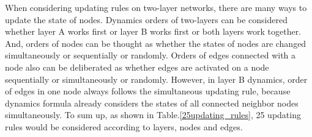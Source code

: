 When considering updating rules on two-layer networks, there are many ways to update the state of nodes. Dynamics orders of two-layers can be considered whether layer A works first or layer B works first or both layers work together. And, orders of nodes can be thought as whether the states of nodes are changed simultaneously or sequentially or randomly. Orders of edges connected with a node also can be deliberated as whether edges are activated on a node sequentially or simultaneously or randomly. However, in layer B dynamics, order of edges in one node always follows the simultaneous updating rule, because dynamics formula already considers the states of all connected neighbor nodes simultaneously. To sum up, as shown in Table.\ref{25updating_rules}, 25 updating rules would be considered according to layers, nodes and edges. \\
